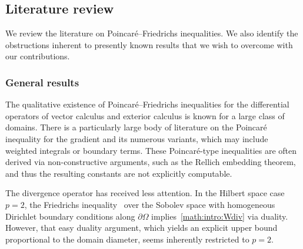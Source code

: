 \documentclass[10pt,a4paper]{article}
\begin{document}
\subsection{Literature review}


We review the literature on Poincar\'e--Friedrichs inequalities. We also identify the obstructions inherent to presently known results that we wish to overcome with our contributions. 

\subsubsection{General results}

The qualitative existence of Poincar\'e--Friedrichs inequalities for the differential operators of vector calculus and exterior calculus is known for a large class of domains. 
There is a particularly large body of literature on the Poincar\'e inequality for the gradient and its numerous variants,
which may include weighted integrals or boundary terms. 
These Poincar\'e-type inequalities are often derived via non-constructive arguments, such as the Rellich embedding theorem,
and thus the resulting constants are not explicitly computable. 

The divergence operator has received less attention. 
In the Hilbert space case $p=2$, the Friedrichs inequality~\cite{burenkov1998sobolev} over the Sobolev space
with homogeneous Dirichlet boundary conditions along $\partial \Omega$ implies~\eqref{math:intro:Wdiv} via duality. 
However, that easy duality argument, which yields an explicit upper bound proportional to the domain diameter, seems inherently restricted to $p=2$. 

\end{document}
